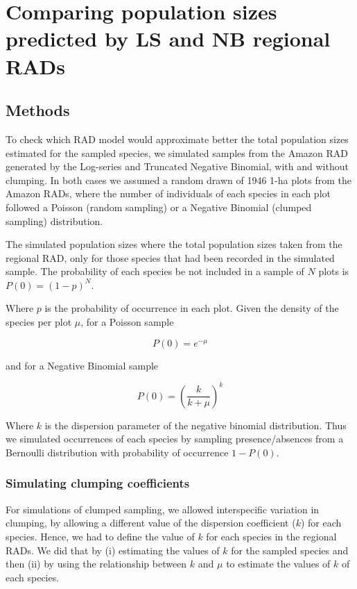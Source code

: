 \documentclass[12pt, A4]{article}\usepackage[]{graphicx}\usepackage[]{color}
\begin{document}
\section{Comparing population sizes predicted by LS and NB regional RADs}

\subsection*{Methods}

To check which RAD model would approximate better the total population sizes estimated
for the sampled species, we simulated samples from the Amazon RAD generated by the Log-series 
and Truncated Negative Binomial, with and without clumping. 
In both cases we assumed a random drawn of 1946 1-ha plots
from the Amazon RADs, where the number of individuals of each species
in each plot followed a Poisson (random sampling) or a Negative Binomial (clumped sampling)
distribution. 

The simulated population sizes where the total population sizes taken from
the regional RAD, only for those species that had been recorded 
in the simulated sample. 
The probability of each species be not included in a sample of $N$ plots is  $P(0)=(1-p)^N$.

Where $p$ is the probability of occurrence in each plot. 
Given the density of the species per plot $\mu$, 
for a Poisson sample 

\begin{equation}
  \label{eq:3}
  P(0) = e^{-\mu} 
\end{equation} 

and for a Negative Binomial sample

\begin{equation}
  \label{eq:2}
  P(0) = \left( \frac{k}{k+\mu} \right)^k 
\end{equation}

Where $k$ is the dispersion parameter of the negative binomial distribution.
Thus we simulated occurrences of each species by sampling presence/absences
from a Bernoulli distribution with probability of occurrence $1-P(0)$.

\subsubsection*{Simulating clumping coefficients}

For simulations of clumped sampling, 
we allowed interspecific variation in clumping, 
by allowing a different value of the dispersion coefficient ($k$) for each species.
Hence, we had to define the value of $k$ for each species in the regional
RADs. We did that by (i) estimating the values of $k$ for the sampled species and
then (ii) by using the relationship between $k$ and $\mu$ to estimate the values of $k$
of each species.
\end{document}
